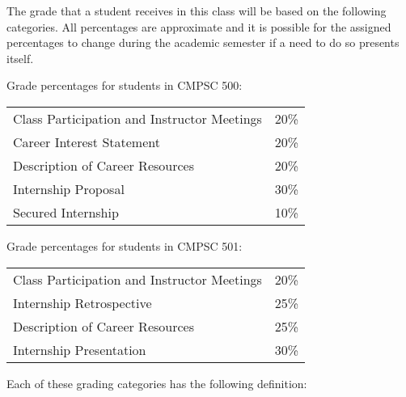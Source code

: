 The grade that a student receives in this class will be based on the following categories. All percentages are
approximate and it is possible for the assigned percentages to change during the academic semester if a need to do so
presents itself. 

Grade percentages for students in CMPSC 500:

\vspace{-.1in}
\begin{center}
\begin{tabular}{ll}
Class Participation and Instructor Meetings & 20\% \\
Career Interest Statement & 20\% \\
Description of Career Resources & 20\% \\
Internship Proposal & 30\% \\
Secured Internship & 10\% \\
\end{tabular}
\end{center}

Grade percentages for students in CMPSC 501:

\vspace{-.1in}
\begin{center}
\begin{tabular}{ll}
Class Participation and Instructor Meetings & 20\% \\
Internship Retrospective & 25\% \\
Description of Career Resources & 25\% \\
Internship Presentation & 30\% \\
\end{tabular}
\end{center}

Each of these grading categories has the following definition:

